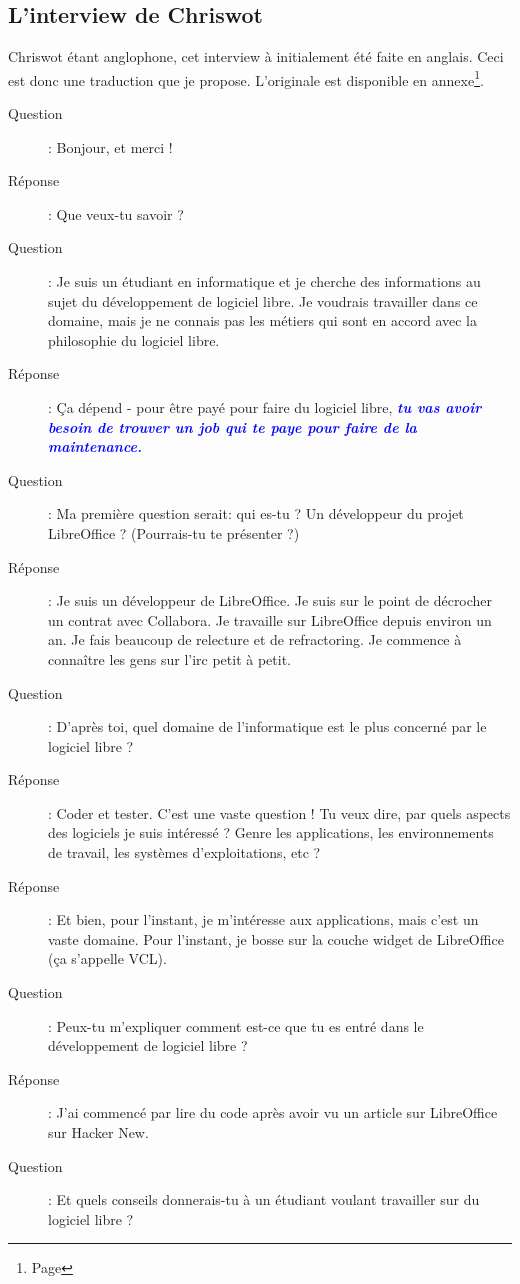 \documentclass[a4paper,12pt, draft]{report}
\newcommand{\importantPoint}[1]{\textcolor{blue}{\textbf{\textit{#1}}}}
\begin{document}
\subsection{L'interview de Chriswot}
Chriswot étant anglophone, cet interview à initialement été faite en anglais. Ceci est donc une traduction que je propose. L'originale est disponible en annexe\footnote{Page \pageref{chriswot_en}}.
\begin{description}
\item [Question]:  Bonjour, et merci !
\item [Réponse]:  Que veux-tu savoir ?
\item [Question]:  Je suis un étudiant en informatique et je cherche des informations au sujet du développement de logiciel libre. Je voudrais travailler dans ce domaine, mais je ne connais pas les métiers qui sont en accord avec la philosophie du logiciel libre.
\item [Réponse]:  Ça dépend - pour être payé pour faire du logiciel libre, \importantPoint{tu vas avoir besoin de trouver un job qui te paye pour faire de la maintenance.}
\item [Question]:  Ma première question serait: qui es-tu ? Un développeur du projet LibreOffice ? (Pourrais-tu te présenter ?)
\item [Réponse]:  Je suis un développeur de LibreOffice. Je suis sur le point de décrocher un contrat avec Collabora. Je travaille sur LibreOffice depuis environ un an. Je fais beaucoup de relecture et de refractoring. Je commence à connaître les gens sur l'irc petit à petit.
\item [Question]:  D'après toi, quel domaine de l'informatique est le plus concerné par le logiciel libre ?
\item [Réponse]:  Coder et tester. C'est une vaste question ! Tu veux dire, par quels aspects des logiciels je suis intéressé ? Genre les applications, les environnements de travail, les systèmes d'exploitations, etc ?
\item [Réponse]:  Et bien, pour l'instant, je m'intéresse aux applications, mais c'est un vaste domaine. Pour l'instant, je bosse sur la couche widget de LibreOffice (ça s'appelle VCL).
\item [Question]: Peux-tu m'expliquer comment est-ce que tu es entré dans le développement de logiciel libre ?
\item [Réponse]:  J'ai commencé par lire du code après avoir vu un article sur LibreOffice sur Hacker New.
\item [Question]:  Et quels conseils donnerais-tu à un étudiant voulant travailler sur du logiciel libre ?

\end{description}
\end{document}

